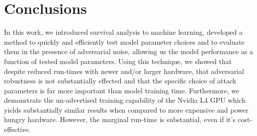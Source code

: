 \documentclass[conference]{IEEEtran}
\begin{document}
\section{Conclusions}
\label{conclusion}
In this work, we introduced survival analysis to machine learning, developed a method to quickly and efficiently test model parameter choices and to evaluate them in the presence of adversarial noise, allowing us the model performance as a function of tested model parameters. Using this technique, we showed that despite reduced run-times with newer and/or larger hardware, that adversarial robustness is not substantially effected and that the specific choice of attack parameters is far more important than model training time. Furthermore, we demonstrate the un-advertised training capability of the Nvidia L4 GPU which yields substantially similar results when compared to more expensive and power hungry hardware. However, the marginal run-time is substantial, even if it's cost-effective.

%
\IEEEpeerreviewmaketitle


\clearpage


\end{document}
